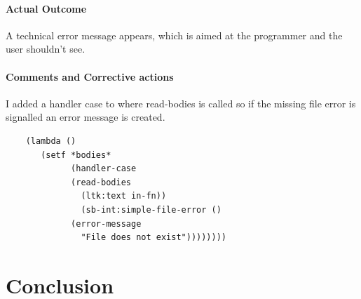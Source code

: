 \paragraph{Actual Outcome}
A technical error message appears, which is aimed at the programmer and the user
shouldn't see.
\paragraph{Comments and Corrective actions}
I added a handler case to where read-bodies is called so if the missing file
error is signalled an error message is created.
\begin{lstlisting}
	(lambda () 
	   (setf *bodies* 
	         (handler-case 
		     (read-bodies 
		       (ltk:text in-fn))
	           (sb-int:simple-file-error ()
		     (error-message
		       "File does not exist"))))))))
\end{lstlisting}

\section{Conclusion}


